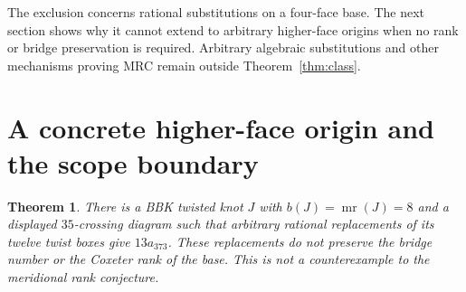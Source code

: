 \documentclass[11pt]{article}
\newtheorem{theorem}{Theorem}
\begin{document}
The exclusion concerns rational substitutions on a four-face base.
The next section shows why it cannot extend to arbitrary higher-face
origins when no rank or bridge preservation is required. Arbitrary
algebraic substitutions and other mechanisms proving MRC remain
outside Theorem~\ref{thm:class}.

\section{A concrete higher-face origin and the scope boundary}

\begin{theorem}\label{thm:eightbase}
There is a BBK twisted knot $J$ with $b(J)=\operatorname{mr}(J)=8$
and a displayed $35$-crossing diagram such that arbitrary rational
replacements of its twelve twist boxes give $13a_{373}$.
These replacements do not preserve the bridge number or the Coxeter
rank of the base. This is not a counterexample to the meridional rank
conjecture.
\end{theorem}
\end{document}
